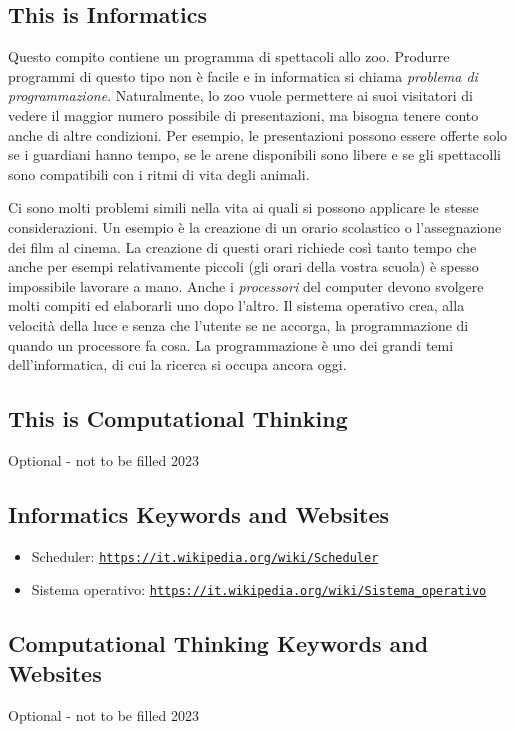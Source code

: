 \documentclass[a4paper,11pt]{report}
\newcommand{\BrochureUrlText}[1]{\texttt{#1}}
\begin{document}
\subsection*{This is Informatics}

Questo compito contiene un programma di spettacoli allo zoo. Produrre programmi di questo tipo non è facile e in informatica si chiama \emph{problema di programmazione}. Naturalmente, lo zoo vuole permettere ai suoi visitatori di vedere il maggior numero possibile di presentazioni, ma bisogna tenere conto anche di altre condizioni. Per esempio, le presentazioni possono essere offerte solo se i guardiani hanno tempo, se le arene disponibili sono libere e se gli spettacolli sono compatibili con i ritmi di vita degli animali.

Ci sono molti problemi simili nella vita ai quali si possono applicare le stesse considerazioni. Un esempio è la creazione di un orario scolastico o l’assegnazione dei film al cinema. La creazione di questi orari richiede così tanto tempo che anche per esempi relativamente piccoli (gli orari della vostra scuola) è spesso impossibile lavorare a mano. Anche i \emph{processori} del computer devono svolgere molti compiti ed elaborarli uno dopo l’altro. Il sistema operativo crea, alla velocità della luce e senza che l’utente se ne accorga, la programmazione di quando un processore fa cosa. La programmazione è uno dei grandi temi dell’informatica, di cui la ricerca si occupa ancora oggi.


\subsection*{This is Computational Thinking}

Optional - not to be filled 2023


\subsection*{Informatics Keywords and Websites}

\begin{itemize}
  \item Scheduler: \href{https://it.wikipedia.org/wiki/Scheduler}{\BrochureUrlText{https://it.wikipedia.org/wiki/Scheduler}}
  \item Sistema operativo: \href{https://it.wikipedia.org/wiki/Sistema_operativo}{\BrochureUrlText{https://it.wikipedia.org/wiki/Sistema\_operativo}}
\end{itemize}


\subsection*{Computational Thinking Keywords and Websites}

Optional - not to be filled 2023
\end{document}
